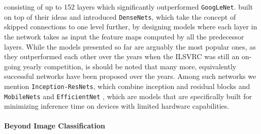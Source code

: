 consisting of up to 152 layers which significantly outperformed \texttt{GoogLeNet}. \citet{huang2017densely} built on top of their ideas and introduced \texttt{DenseNets}, which take the concept of skipped connections to one level further, by designing models where each layer in the network takes as input the feature maps computed by all the predecessor layers. While the models presented so far are arguably the most popular ones, as they outperformed each other over the years when the ILSVRC was still an on-going yearly competition, is should be noted that many more, equivalently successful networks have been proposed over the years. Among such networks we mention \texttt{Inception-ResNets}, which combine inception and residual blocks \cite{szegedy2017inception} and \texttt{MobileNets} \cite{sandler2018mobilenetv2, howard2019searching} and \texttt{EfficientNet} \cite{tan2019efficientnet,}, which are models that are specifically built for minimizing inference time on devices with limited hardware capabilities. 

\paragraph{Beyond Image Classification}

